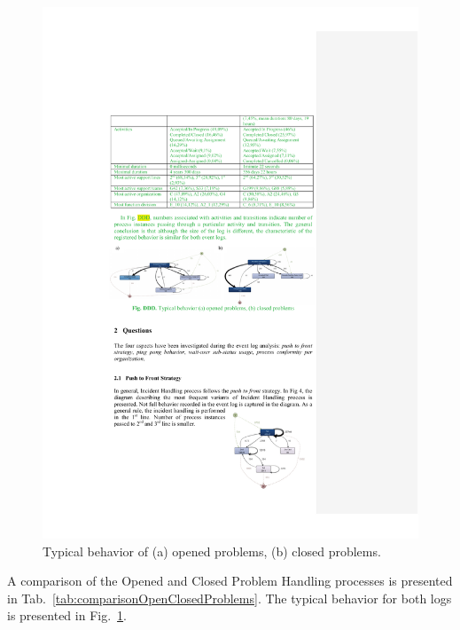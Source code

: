 \documentclass[lnbip]{svmultln}
\begin{document}
\begin{figure}
\centering
\includegraphics[width=\textwidth]{"figs/pic 5"}
\caption{Typical behavior of (a) opened problems, (b) closed problems.}
\label{fig:behaviorOpenedClosedProblem}
\end{figure}

A comparison of the Opened and Closed Problem Handling processes is presented in Tab.~\ref{tab:comparisonOpenClosedProblems}. The typical behavior for both logs is presented in Fig.~\ref{fig:behaviorOpenedClosedProblem}. 
\end{document}
